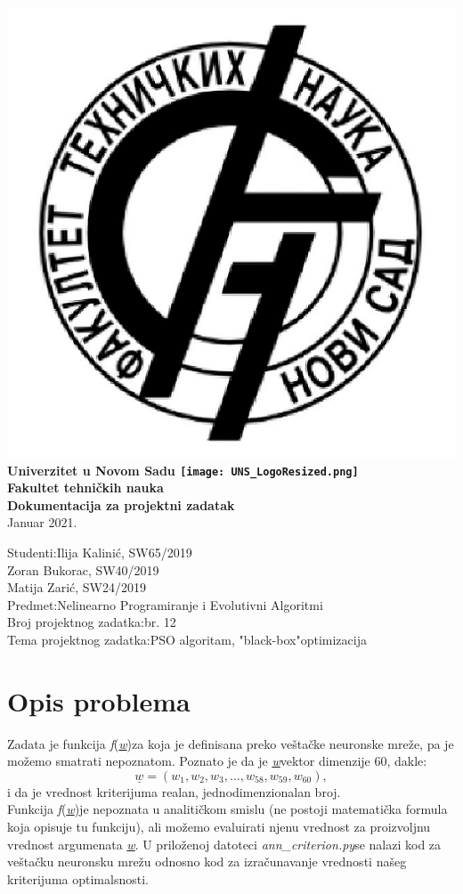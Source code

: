 \documentclass[12pt, a4paper]{article}
\newcommand{\vecw}{\underline{\textit{w}}}
\newcommand{\fw}{\textit{f}(\vecw)}
\DeclareRobustCommand{\ftnlogo}{%
  \begingroup\normalfont
  \includegraphics[height=4\fontcharht\font`\B]{FTN_LogoResized.png}%
  \endgroup
}
\DeclareRobustCommand{\unslogo}{%
  \begingroup\normalfont
  \texttt{[image: UNS\_LogoResized.png]}%
  \endgroup
}
\begin{document}
    \begin{titlepage}
        \begin{center}
        \huge{\textbf{\ftnlogo Univerzitet u Novom Sadu \unslogo\\ [12pt]  Fakultet tehničkih nauka}}\\
        \vspace{55mm}
        \LARGE{\textbf{Dokumentacija za projektni zadatak}}\\
        \vspace{35mm}
        Januar 2021.
        \vspace{35mm}
        \end{center}
        \begin{flushright}
            Studenti:\hfill Ilija Kalinić, SW65/2019\\
                            Zoran Bukorac, SW40/2019\\
                            Matija Zarić, SW24/2019\\
            \vspace{3pt}
            Predmet:\hfill Nelinearno Programiranje i Evolutivni Algoritmi\\
            \vspace{3pt}
            Broj projektnog zadatka:\hfill br. 12\\
            \vspace{3pt}
            Tema projektnog zadatka:\hfill PSO algoritam, "black-box"optimizacija\\
        \end{flushright}
        
    
    \end{titlepage}

    \section{Opis problema}
    Zadata je funkcija \fw\space za koja je definisana preko veštačke neuronske mreže, pa je možemo smatrati nepoznatom.
    Poznato je da je \vecw\space vektor dimenzije 60, dakle:
    \begin{equation}
    \vecw = ( w_1, w_2, w_3, \ldots, w_{58}, w_{59}, w_{60} ),
    \end{equation}
    i da je vrednost kriterijuma realan, jednodimenzionalan broj. \\
    Funkcija \fw\space je nepoznata u analitičkom smislu (ne postoji matematička formula koja
    opisuje tu funkciju), ali možemo evaluirati njenu vrednost za proizvoljnu vrednost argumenata
    \vecw.
    U priloženoj datoteci \textit{ann\_criterion.py}\space se nalazi kod za veštačku neuronsku
    mrežu odnosno kod za izračunavanje vrednosti našeg kriterijuma optimalsnosti. \\
\end{document}
